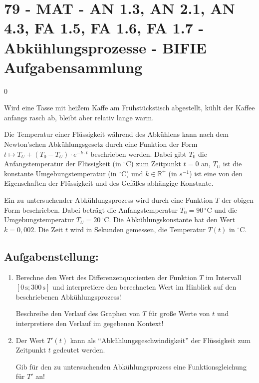 \section{79 - MAT - AN 1.3, AN 2.1, AN 4.3, FA 1.5, FA 1.6, FA 1.7 - Abkühlungsprozesse - BIFIE Aufgabensammlung}

\begin{langesbeispiel} \item[0] %
	
Wird eine Tasse mit heißem Kaffe am Frühstückstisch abgestellt, kühlt der Kaffee anfangs rasch ab, bleibt aber relativ lange warm.\leer

Die Temperatur einer Flüssigkeit während des Abkühlens kann nach dem Newton'schen Abkühlungsgesetz durch eine Funktion der Form $t\mapsto T_U+(T_0-T_U)\cdot e^{-k\cdot t}$ beschrieben werden. Dabei gibt $T_0$ die Anfangstemperatur der Flüssigkeit (in $^\circ\text{C}$) zum Zeitpunkt $t=0$ an, $T_U$ ist die konstante Umgebungstemperatur (in $^\circ\text{C}$) und $k\in\mathbb{R}^+$ (in $s^{-1}$) ist eine von den Eigenschaften der Flüssigkeit und des Gefäßes abhängige Konstante.\leer

Ein zu untersuchender Abkühlungsprozess wird durch eine Funktion $T$ der obigen Form beschrieben. Dabei beträgt die Anfangstemperatur $T_0=90\,^\circ\text{C}$ und die Umgebungstemperatur $T_U=20\,^\circ\text{C}$. Die Abkühlungskonstante hat den Wert $k=0,002$. Die Zeit $t$ wird in Sekunden gemessen, die Temperatur $T(t)$ in $^\circ\text{C}$.

\subsection{Aufgabenstellung:}
\begin{enumerate}
	\item Berechne den Wert des Differenzenquotienten der Funktion $T$ im Intervall $[0\,\text{s};300\,\text{s}]$ und interpretiere den berechneten Wert im Hinblick auf den beschriebenen Abkühlungsprozess!\leer
	
	Beschreibe den Verlauf des Graphen von $T$ für große Werte von $t$ und interpretiere den Verlauf im gegebenen Kontext!\leer
	
	\item Der Wert $T'(t)$ kann als "`Abkühlungsgeschwindigkeit"' der Flüssigkeit zum Zeitpunkt $t$ gedeutet werden.\leer
	
	Gib für den zu untersuchenden Abkühlungsprozess eine Funktionsgleichung für $T'$ an!
	

\end{enumerate}
\end{langesbeispiel}
